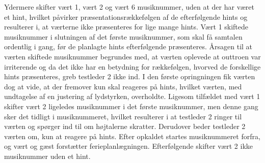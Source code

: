 Ydermere skifter vært 1, vært 2 og vært 6 musiknummer, uden at der har været et hint, hvilket påvirker præsentationsrækkefølgen af de efterfølgende hints og resulterer i, at værterne ikke præsenteres for lige mange hints. Vært 1 skiftede musiknummer i slutningen af det første musiknummer, som skal få samtalen ordentlig i gang, før de planlagte hints efterfølgende præsenteres. Årsagen til at værten skiftede musiknummer begrundes med, at værten oplevede at outtroen var irriterende og da det ikke har en betydning for rækkefølgen, hvorved de forskellige hints præsenteres, greb testleder 2 ikke ind. I den første opringningen fik værten dog at vide, at der fremover kun skal reageres på hints, hvilket værten, med undtagelse af en justering af lydstyrken, overholdte. Ligesom tilfældet med vært 1 skifter vært 2 ligeledes musiknummer i det første musiknummer, men denne gang sker det tidligt i musiknummeret, hvilket resulterer i at testleder 2 ringer til værten og spørger ind til om højtalerne skratter. Derudover beder testleder 2 værten om, kun at reagere på hints. Efter opkaldet startes musiknummeret forfra, og vært og gæst forstætter ferieplanlægningen. Efterfølgende skifter vært 2 ikke musiknummer uden et hint.    


